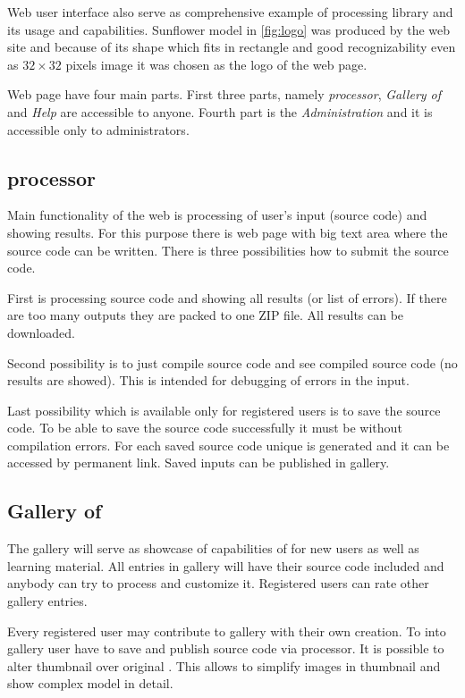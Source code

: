 Web user interface also serve as comprehensive example of \lsystem processing library and its usage and capabilities.
Sunflower model in \autoref{fig:logo} was produced by the web site and because of its shape which fits in rectangle and good recognizability even as $32 \times 32$ pixels image it was chosen as the logo of the web page.

Web page have four main parts. First three parts, namely \emph{\lsystem processor}, \emph{Gallery of \lsystems} and \emph{Help} are accessible to anyone.
Fourth part is the \emph{Administration} and it is accessible only to administrators.

\subsection{\lsystem processor}

Main functionality of the web is processing of user's input (source code) and showing results.
For this purpose there is web page with big text area where the source code can be written.
There is three possibilities how to submit the source code.

First is processing source code and showing all results (or list of errors).
If there are too many outputs they are packed to one ZIP file.
All results can be downloaded.

Second possibility is to just compile source code and see compiled source code (no results are showed).
This is intended for debugging of errors in the input.

Last possibility which is available only for registered users is to save the source code.
To be able to save the source code successfully it must be without compilation errors.
For each saved source code unique is generated and it can be accessed by permanent link.
Saved inputs can be published in gallery.


\subsection{Gallery of \lsystems}

The gallery will serve as showcase of capabilities of \lsystems for new users as well as learning material.
All entries in gallery will have their source code included and anybody can try to process and customize it.
Registered users can rate other gallery entries.

Every registered user may contribute to gallery with their own creation.
To \lsystem into gallery user have to save and publish source code via \lsystem processor.
It is possible to alter thumbnail \lsystem over original \lsystem.
This allows to simplify images in thumbnail and show complex model in detail.


